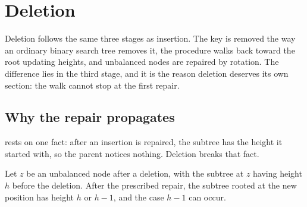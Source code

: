 \section{Deletion}
\label{sec:deletion}

Deletion follows the same three stages as insertion. The key is removed the way
an ordinary binary search tree removes it, the procedure walks back toward the
root updating heights, and unbalanced nodes are repaired by rotation. The
difference lies in the third stage, and it is the reason deletion deserves its
own section: the walk cannot stop at the first repair.

\begin{algorithm}[t]
\caption{Deletion. A node with two children is removed by copying its in-order
successor into it and deleting the successor instead, which always has at most
one child.}
\label{alg:delete}
\end{algorithm}

\subsection{Why the repair propagates}

 rests on one fact: after an insertion is repaired, the
subtree has the height it started with, so the parent notices nothing. Deletion
breaks that fact.

\begin{lemma}
\label{lem:shrink}
Let $z$ be an unbalanced node after a deletion, with the subtree at $z$ having
height $h$ before the deletion. After the prescribed repair, the subtree rooted
at the new position has height $h$ or $h-1$, and the case $h-1$ can occur.
\end{lemma}


